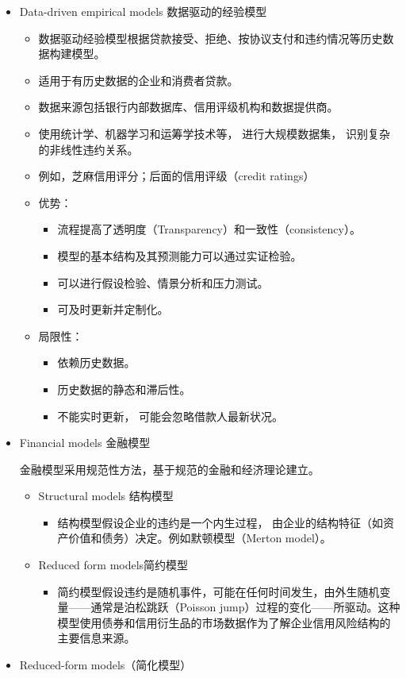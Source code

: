 \begin{itemize}
    
    

    \item Data-driven empirical models 数据驱动的经验模型
    \begin{itemize}
        \item 数据驱动经验模型根据贷款接受、拒绝、按协议支付和违约情况等历史数据构建模型。
        \item 适用于有历史数据的企业和消费者贷款。
        \item 数据来源包括银行内部数据库、信用评级机构和数据提供商。
        \item 使用统计学、机器学习和运筹学技术等， 进行大规模数据集， 识别复杂的非线性违约关系。
        \item 例如，芝麻信用评分；后面的信用评级（credit ratings）
        \item 优势：
        \begin{itemize}
            \item 流程提高了透明度（Transparency）和一致性（consistency）。
            \item 模型的基本结构及其预测能力可以通过实证检验。
            \item 可以进行假设检验、情景分析和压力测试。
            \item 可及时更新并定制化。 
        \end{itemize}
        \item 局限性：
        \begin{itemize}
            \item 依赖历史数据。
            \item 历史数据的静态和滞后性。
            \item 不能实时更新， 可能会忽略借款人最新状况。
        \end{itemize}
    \end{itemize}

    \item Financial models 金融模型
    

    金融模型采用规范性方法，基于规范的金融和经济理论建立。

    \begin{itemize}
        \item Structural models 结构模型 
            \begin{itemize}
            \item 结构模型假设企业的违约是一个内生过程， 由企业的结构特征（如资产价值和债务）决定。例如默顿模型（Merton model）。
            \end{itemize}

        \item Reduced form models简约模型
            \begin{itemize}
            \item 简约模型假设违约是随机事件，可能在任何时间发生，由外生随机变量——通常是泊松跳跃（Poisson jump）过程的变化——所驱动。这种模型使用债券和信用衍生品的市场数据作为了解企业信用风险结构的主要信息来源。
            \end{itemize}
        \end{itemize}
        \item Reduced-form models（简化模型）
    \end{itemize}

